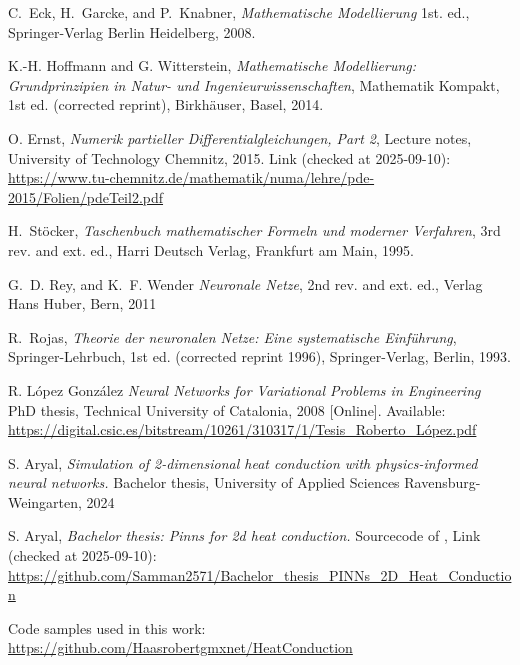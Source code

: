 \documentclass[a4paper,11pt]{article}
\begin{document}
\newpage
\begin{thebibliography}{9}

C.~Eck, H.~Garcke, and P.~Knabner,
\emph{Mathematische Modellierung}
1st. ed., Springer-Verlag Berlin Heidelberg, 2008.

K.-H. Hoffmann and G. Witterstein, 
\emph{Mathematische Modellierung: Grundprinzipien in Natur- und Ingenieurwissenschaften}, 
Mathematik Kompakt, 1st ed. (corrected reprint), Birkhäuser, Basel, 2014.

O. Ernst,
\emph{Numerik partieller Differentialgleichungen, Part 2}, 
Lecture notes, University of Technology Chemnitz, 2015.
Link (checked at 2025-09-10): \url{https://www.tu-chemnitz.de/mathematik/numa/lehre/pde-2015/Folien/pdeTeil2.pdf}

H.~Stöcker, 
\emph{Taschenbuch mathematischer Formeln und moderner Verfahren}, 
3rd rev. and ext. ed., Harri Deutsch Verlag, Frankfurt am Main, 1995.

G.~D. Rey, and K.~F. Wender
\emph{Neuronale Netze}, 
2nd rev. and ext. ed., Verlag Hans Huber, Bern, 2011

R.~Rojas,
\emph{Theorie der neuronalen Netze: Eine systematische Einführung},
Springer-Lehrbuch, 1st ed. (corrected reprint 1996), Springer-Verlag, Berlin, 1993.

R. López González
\emph{Neural Networks for Variational Problems in Engineering}
PhD thesis, Technical University of Catalonia, 2008
[Online]. Available: \url{https://digital.csic.es/bitstream/10261/310317/1/Tesis_Roberto_López.pdf}

S. Aryal, 
\emph{Simulation of 2-dimensional heat conduction with physics-informed neural networks.}
Bachelor thesis, University of Applied Sciences Ravensburg-Weingarten, 2024

S. Aryal, 
\emph{Bachelor thesis: Pinns for 2d heat conduction.}
Sourcecode of \cite{aryal2024a}, Link (checked at 2025-09-10): \url{https://github.com/Samman2571/Bachelor_thesis_PINNs_2D_Heat_Conduction}

Code samples used in this work: \url{https://github.com/Haasrobertgmxnet/HeatConduction}

\end{thebibliography}


\newpage

\end{document}
